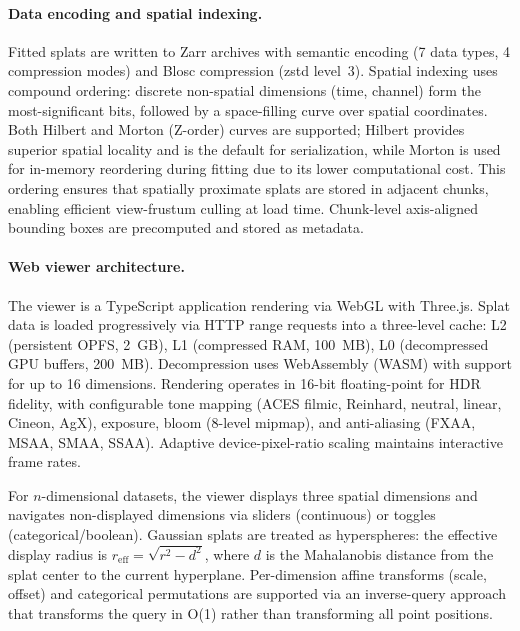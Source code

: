 \paragraph{Data encoding and spatial indexing.}
Fitted splats are written to Zarr\cite{miles2023zarr} archives with semantic encoding (7 data types, 4 compression modes) and Blosc compression (zstd level~3).
Spatial indexing uses compound ordering: discrete non-spatial dimensions (time, channel) form the most-significant bits, followed by a space-filling curve over spatial coordinates. Both Hilbert and Morton (Z-order) curves are supported; Hilbert provides superior spatial locality and is the default for serialization, while Morton is used for in-memory reordering during fitting due to its lower computational cost.
This ordering ensures that spatially proximate splats are stored in adjacent chunks, enabling efficient view-frustum culling at load time.
Chunk-level axis-aligned bounding boxes are precomputed and stored as metadata.

\paragraph{Web viewer architecture.}
The \luxar viewer is a TypeScript application rendering via WebGL with Three.js.
Splat data is loaded progressively via HTTP range requests into a three-level cache: L2 (persistent OPFS, 2~GB), L1 (compressed RAM, 100~MB), L0 (decompressed GPU buffers, 200~MB).
Decompression uses WebAssembly (WASM) with support for up to 16 dimensions.
Rendering operates in 16-bit floating-point for HDR fidelity, with configurable tone mapping (ACES filmic, Reinhard, neutral, linear, Cineon, AgX), exposure, bloom (8-level mipmap), and anti-aliasing (FXAA, MSAA, SMAA, SSAA).
Adaptive device-pixel-ratio scaling maintains interactive frame rates.

For $n$-dimensional datasets, the viewer displays three spatial dimensions and navigates non-displayed dimensions via sliders (continuous) or toggles (categorical/boolean).
Gaussian splats are treated as hyperspheres: the effective display radius is $r_\text{eff} = \sqrt{r^2 - d^2}$, where $d$ is the Mahalanobis distance from the splat center to the current hyperplane.
Per-dimension affine transforms (scale, offset) and categorical permutations are supported via an inverse-query approach that transforms the query in O(1) rather than transforming all point positions.

